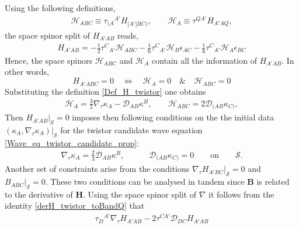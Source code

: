 \documentclass[10pt,a4paper]{article}
\theoremstyle{plain}
\def\bmB{{\bm B}}
\def\bmH{{\bm H}}
\begin{document}
{%

Using the following definitions,
\begin{align}
  \mathcal{H} _{ABC}  \equiv \tau _{(A}{}^{A'}H_{|A'|BC)}, \qquad
  \mathcal{H}_{A}  \equiv  \tau^{QA'} H_{A'AQ},
\end{align}
the space spinor split of $H_{A'AB}$ reads,
\begin{align}
  H_{A'AB} = - \tfrac{1}{2} \tau ^{C}{}_{A'} \mathcal{H} _{ABC}  -
  \tfrac{1}{6} \tau ^{C}{}_{A'} \mathcal{H} _{B} \epsilon _{AC}  -
  \tfrac{1}{6} \tau ^{C}{}_{A'} \mathcal{H} _{A} \epsilon _{BC}
\end{align}
Hence, the space spinors $\mathcal{H} _{ABC}$ and $\mathcal{H}_{A}$
contain all the information of $H_{A'AB}$. In other words,
\[
H_{A'ABC}=0 \quad                   %
\iff \quad \mathcal{H} _{A}=0      %
\quad
\& \quad \mathcal{H}_{ABC}=0  %
\]
Substituting the definition \eqref{Def_H_twistor} one obtains
\begin{align}\label{spacespinordecompHtotwistorders}
\mathcal{H} _{A} = \tfrac{3}{2} \nabla_\tau \kappa_{A} - \mathcal{D} _{AB}\kappa^{B}, \qquad \mathcal{H} _{ABC} = 2 \mathcal{D} _{(AB}\kappa _{C)},
\end{align}
Then $H_{A'AB}|_{\mathcal{S}}=0$  imposes then following conditions on the
the initial data
$(\kappa_A,\nabla_\tau\kappa_A)|_{\mathcal{S}}$
for the twistor candidate wave equation
\eqref{Wave_eq_twistor_candidate_prop}:
\begin{align}\label{H_twistor_vanishes_ID}
 \nabla_\tau \kappa _{A} = \tfrac{2}{3} \mathcal{D} _{AB}\kappa ^{B}, \qquad
 \quad \mathcal{D} _{(AB}\kappa _{C)}=0 \qquad \text{on} \qquad \mathcal{S}.
\end{align}
Another set of constraints arise from the conditions
$\nabla_\tau H_{A'BC}|_{\mathcal{S}}=0$ and $B_{ABC}|_{\mathcal{S}}=0$. These two
conditions can be analysed in tandem since $\bmB$ is related to the derivative of
$\bmH$. Using the space spinor split of $\nabla$ it follows from the
identity \eqref{derH_twistor_toBandQ} that
\begin{align}
  \tau _{D}{}^{A'}\nabla_\tau H_{A'AB}   -2 \tau ^{CA'} \mathcal{D} _{DC}H_{A'AB}

\end{align}}
\end{document}
